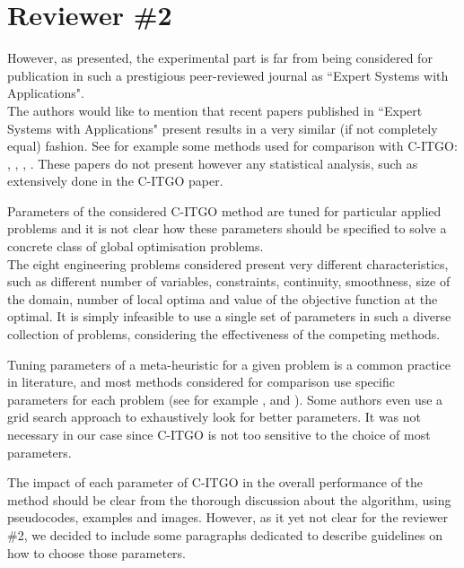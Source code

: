 
\section*{Reviewer \#2}

{\color{red} However, as presented, the experimental part is far from being considered for publication in such a prestigious peer-reviewed journal as ``Expert Systems with Applications". }\\

The authors would like to mention that recent papers published in ``Expert Systems with Applications" present results in a very similar (if not completely equal) fashion. See for example some methods used for comparison with C-ITGO: \cite{NM-PSO}, \cite{CMA-ES}, \cite{MVDE}, \cite{QPSO}. These papers do not present however any statistical analysis, such as extensively done in the C-ITGO paper.


\vspace{1cm}


{\color{red} Parameters of the considered C-ITGO method are tuned for particular applied problems and it is not clear how these parameters should be specified to solve a concrete class of global optimisation problems.} \\

The eight engineering problems considered present very different characteristics, such as different number of variables, constraints, continuity, smoothness, size of the domain, number of local optima and value of the objective function at the optimal. It is simply infeasible to use a single set of parameters in such a diverse collection of problems, considering the effectiveness of the competing methods.

Tuning parameters of a meta-heuristic for a given problem is a common practice in literature, and most methods considered for comparison use specific parameters for each problem (see for example \cite{IPSO}, \cite{IAPSO} and \cite{IABC-Mal}). Some authors even use a grid search approach to exhaustively look for better parameters. It was not necessary in our case since C-ITGO is not too sensitive to the choice of most parameters.

The impact of each parameter of C-ITGO in the overall performance of the method should be clear from the thorough discussion about the algorithm, using pseudocodes, examples and images. However, as it yet not clear for the reviewer \#2, we decided to include some paragraphs dedicated to describe guidelines on how to choose those parameters.


